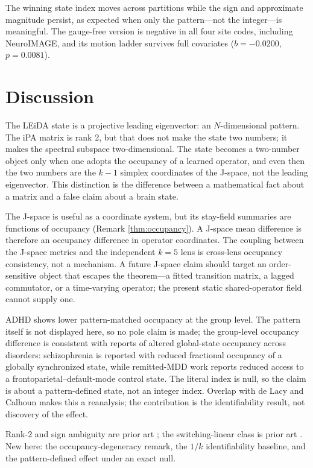\documentclass[11pt]{article}
\theoremstyle{definition}
\begin{document}
\noindent The winning state index moves across partitions while the sign and approximate
magnitude persist, as expected when only the pattern---not the integer---is meaningful.
The gauge-free version is negative in all four site codes, including NeuroIMAGE, and
its motion ladder survives full covariates ($b=-0.0200$, $p=0.0081$).

\section{Discussion}
\label{sec:discussion}

The LEiDA state is a projective leading eigenvector: an $N$-dimensional pattern. The iPA
matrix is rank 2, but that does not make the state two numbers; it makes the spectral
subspace two-dimensional. The state becomes a two-number object only when one adopts
the occupancy of a learned operator, and even then the two numbers are the $k-1$ simplex
coordinates of the J-space, not the leading eigenvector. This distinction is the
difference between a mathematical fact about a matrix and a false claim about a brain
state.

The J-space is useful as a coordinate system, but its stay-field summaries are functions
of occupancy (Remark \ref{thm:occupancy}). A J-space mean difference is therefore an
occupancy difference in operator coordinates. The coupling between the J-space metrics
and the independent $k=5$ lens is cross-lens occupancy consistency, not a mechanism. A
future J-space claim should target an order-sensitive object that escapes the
theorem---a fitted transition matrix, a lagged commutator, or a time-varying operator;
the present static shared-operator field cannot supply one.

ADHD shows lower pattern-matched occupancy at the group level. The pattern itself is not
displayed here, so no pole claim is made; the group-level occupancy difference is consistent
with reports of altered global-state occupancy across disorders: schizophrenia is reported with
reduced fractional occupancy of a globally synchronized state\cite{Farinha2022}, while remitted-MDD
work reports reduced access to a frontoparietal--default-mode control state\cite{Figueroa2019}.
The literal index is
null, so the claim is about a pattern-defined state, not an integer index. Overlap with
de Lacy and Calhoun makes this a reanalysis; the contribution is the identifiability
result, not discovery of the effect.

Rank-2 and sign ambiguity are prior art \cite{Glerean2012,Olsen2022,EiDA2024}; the
switching-linear class is prior art \cite{Linderman2017,Taghia2018}. New here: the
occupancy-degeneracy remark, the $1/k$ identifiability baseline, and the pattern-defined
effect under an exact null.
\end{document}
